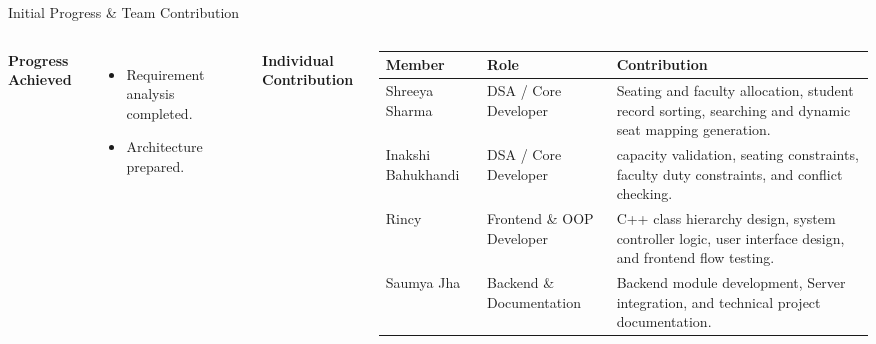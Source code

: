 \documentclass[aspectratio=169,11pt]{beamer}
\begin{document}
\begin{frame}{Initial Progress \& Team Contribution}
\begin{columns}[T,totalwidth=\textwidth]
\textbf{\color{GEUBlue}Progress Achieved}
\begin{itemize}\itemsep3pt
\item Requirement analysis completed.
\item Architecture prepared.
\end{itemize}
\textbf{\color{GEUBlue}Individual Contribution}
\vspace{2mm}
\scriptsize
\begin{tabularx}{\textwidth}{@{}p{2.5cm}p{2cm}X@{}}
\toprule
Member & Role & Contribution\\
\midrule
Shreeya Sharma & DSA / Core Developer & Seating and faculty allocation, student record sorting, searching and dynamic seat mapping generation.\\ 
Inakshi Bahukhandi & DSA / Core Developer & capacity validation, seating constraints, faculty duty constraints, and conflict checking.\\
Rincy & Frontend \& OOP Developer & C++ class hierarchy design, system controller logic, user interface design, and frontend flow testing.\\
Saumya Jha & Backend \& Documentation  & Backend module development, Server integration, and technical project documentation.\\
\bottomrule
\end{tabularx}
\end{columns}
\end{frame}
\end{document}

